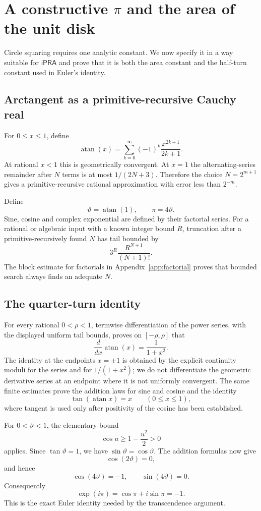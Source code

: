 \documentclass[11pt]{article}
\newcommand{\ipra}{\mathsf{iPRA}}
\newcommand{\atan}{\operatorname{atan}}
\begin{document}
\section{A constructive $\pi$ and the area of the unit disk}

Circle squaring requires one analytic constant.  We now specify it in a way suitable for $\ipra$ and prove that it is both the area constant and the half-turn constant used in Euler's identity.

\subsection{Arctangent as a primitive-recursive Cauchy real}

For $0\le x\le1$, define
\[
  \atan(x)=\sum_{k=0}^{\infty}(-1)^k\frac{x^{2k+1}}{2k+1}.
\]
At rational $x<1$ this is geometrically convergent.  At $x=1$ the alternating-series remainder after $N$ terms is at most $1/(2N+3)$.  Therefore the choice $N=2^{m+1}$ gives a primitive-recursive rational approximation with error less than $2^{-m}$.

Define
\[
  \vartheta=\atan(1),\qquad \pi=4\vartheta.
\]
Sine, cosine and complex exponential are defined by their factorial series.  For a rational or algebraic input with a known integer bound $R$, truncation after a primitive-recursively found $N$ has tail bounded by
\[
  3^R\frac{R^{N+1}}{(N+1)!}.
\]
The block estimate for factorials in Appendix~\ref{app:factorial} proves that bounded search always finds an adequate $N$.

\subsection{The quarter-turn identity}

For every rational $0<\rho<1$, termwise differentiation of the power series, with the displayed uniform tail bounds, proves on $[-\rho,\rho]$ that
\[
  \frac{d}{dx}\atan(x)=\frac{1}{1+x^2}.
\]
The identity at the endpoints $x=\pm1$ is obtained by the explicit continuity moduli for the series and for $1/(1+x^2)$; we do not differentiate the geometric derivative series at an endpoint where it is not uniformly convergent.
The same finite estimates prove the addition laws for sine and cosine and the identity
\[
  \tan(\atan x)=x\qquad(0\le x\le1),
\]
where tangent is used only after positivity of the cosine has been established.

For $0<\vartheta<1$, the elementary bound
\[
  \cos u\ge1-\frac{u^2}{2}>0
\]
applies.  Since $\tan\vartheta=1$, we have $\sin\vartheta=\cos\vartheta$.  The addition formulas now give
\[
  \cos(2\vartheta)=0,
\]
and hence
\[
  \cos(4\vartheta)=-1,\qquad \sin(4\vartheta)=0.
\]
Consequently
\[
  \exp(i\pi)=\cos\pi+i\sin\pi=-1.
\]
This is the exact Euler identity needed by the transcendence argument.
\end{document}
